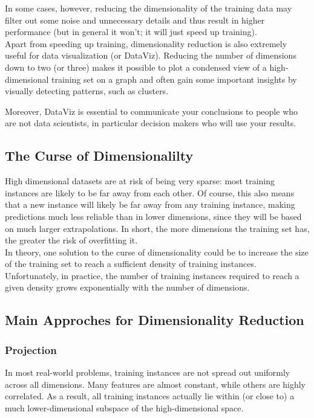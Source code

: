 \documentclass[french]{article}
\begin{document}
In some cases, however, reducing the dimensionality of the training data may filter out some noise and unnecessary details and thus result in higher performance (but in general it won’t; it will just speed up training).\\

Apart from speeding up training, dimensionality reduction is also extremely useful for data visualization (or DataViz). Reducing the number of dimensions down to two (or three) makes it possible to plot a condensed view of a high-dimensional training set on a graph and often gain some important insights by visually detecting patterns, such as clusters.

Moreover, DataViz is essential to communicate your conclusions to people who are not data scientists, in particular decision makers who will use your results.

\subsection{The Curse of Dimensionalilty}

High dimensional datasets are at risk of being very sparse: most training instances are likely to be far away from each other. Of course, this also means that a new instance will likely be far away from any training instance, making predictions much less reliable than in lower dimensions, since they will be based on much larger extrapolations.  In short, the more dimensions the training set has, the greater the risk of overfitting it.\\

In theory, one solution to the curse of dimensionality could be to increase the size of the training set to reach a sufficient density of training instances. Unfortunately, in practice, the number of training instances required to reach a given density grows exponentially with the number of dimensions.

\subsection{Main Approches for Dimensionality Reduction}

\subsubsection{Projection}

In most real-world problems, training instances are not spread out uniformly across all dimensions. Many features are almost constant, while others are highly correlated.  As a result, all training instances actually lie within (or close to) a much lower-dimensional subspace of the high-dimensional space.
\end{document}
